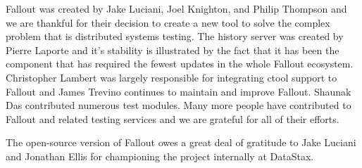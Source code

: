 \documentclass[a4paper,fleqn]{cas-dc}
\begin{document}
Fallout was created by Jake Luciani, Joel Knighton, and Philip Thompson and we are thankful for
their decision to create a new tool to solve the complex problem that is distributed systems
testing. The history server was created by Pierre Laporte and it’s stability is illustrated by the
fact that it has been the component that has required the fewest updates in the whole Fallout
ecosystem. Christopher Lambert was largely responsible for integrating ctool support to Fallout and
James Trevino continues to maintain and improve Fallout. Shaunak Das contributed numerous test
modules. Many more people have contributed to Fallout and related testing services and we are
grateful for all of their efforts.

The open-source version of Fallout owes a great deal of gratitude to Jake Luciani and Jonathan Ellis
for championing the project internally at DataStax.

%





\end{document}
